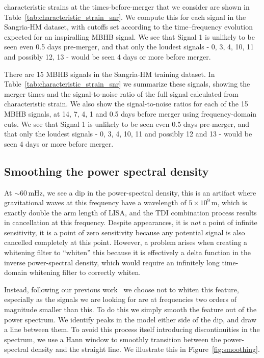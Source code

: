  characteristic strains at the times-before-merger that we consider are shown in
Table~\ref{tab:characteristic_strain_snr}.
We compute this for each signal in the Sangria-HM dataset, with cutoffs set according to the
time--frequency evolution expected for an inspiralling \ac{MBHB} signal.
We see that Signal 1 is unlikely to be seen even 0.5 days pre-merger, and that only the loudest signals -
0, 3, 4, 10, 11 and possibly 12, 13 - would be seen 4 days or more before merger.


\begin{table}
    
    \caption{
        Optimal signal-to-noise ratios (SNRs) for signals in the Sangria-HM dataset.
        Waveforms are generated using FastBHB as implemented in \texttt{lisabeta} \cite{Marsat:2020rtl}.
    }
    \label{tab:characteristic_strain_snr}
\end{table}

There are 15 \ac{MBHB} signals in the Sangria-HM training dataset.
In Table~\ref{tab:characteristic_strain_snr} we summarize these signals, showing the merger
times and the signal-to-noise ratio of the full signal calculated from characteristic strain.
We also show the signal-to-noise ratios for each of the 15 \ac{MBHB} signals, at 14, 7, 4, 1 and 0.5 days before merger using frequency-domain cuts.
We see that Signal 1 is unlikely to be seen even 0.5 days pre-merger, and that only the loudest signals - 0, 3, 4, 10, 11 and possibly 12 and 13 - would be seen 4 days or more before merger.

\subsection{Smoothing the power spectral density}
\label{subsec:smoothing}
At $\sim60$\,mHz, we see a dip in the power-spectral density, this is an artifact where gravitational waves at this frequency have a wavelength
of $5\times10^{9}$\,m, which is exactly double the arm length of LISA, and the TDI combination process results in cancellation at this frequency.
Despite appearances, it is \emph{not} a point of infinite sensitivity, it is a point of zero sensitivity because any potential signal is also cancelled completely at this point.
However, a problem arises when creating a whitening filter
to ``whiten'' this because it is effectively a delta function in the inverse power-spectral density, which would require an infinitely long time-domain whitening filter to correctly whiten.

Instead, following our previous work~\cite{CabournDavies:2024hea} we choose not to whiten this feature, especially as the signals we are looking for are at frequencies two orders of magnitude
smaller than this.
To do this we simply smooth the feature out of the power spectrum.
We identify peaks in the model either side of the dip, and draw a line between them.
To avoid this process itself introducing discontinuities in the spectrum, we use a Hann window to smoothly transition between the power-spectral density
and the straight line.
We illustrate this in Figure~\ref{fig:smoothing}.



